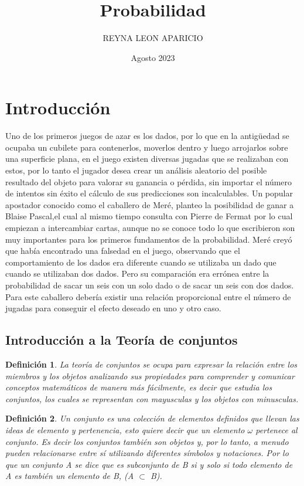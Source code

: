 \documentclass[12pt]{article}
\title{Probabilidad}
\author{REYNA LEON  APARICIO}
\date{Agosto 2023}
\newtheorem{Def}{\quad Definición}
\begin{document}
\maketitle

\section{Introducción}

Uno de los primeros juegos de azar es los dados, por lo que en la antigüedad se ocupaba un cubilete para contenerlos, moverlos dentro y luego arrojarlos sobre una superficie plana, en el juego existen diversas jugadas que se realizaban con estos, por lo tanto el jugador desea crear un análisis aleatorio del posible resultado  del objeto para valorar su ganancia o pérdida, sin importar el número de intentos sin éxito el cálculo de sus predicciones son incalculables. Un popular apostador conocido como el caballero de Meré, planteo la posibilidad de ganar a Blaise Pascal,el cual al mismo tiempo consulta con Pierre de Fermat por lo cual empiezan a intercambiar cartas, aunque no se conoce todo lo que escribieron son muy importantes para los primeros fundamentos de la probabilidad. Meré creyó que había encontrado una falsedad en el juego, observando que el comportamiento de los dados era diferente cuando se utilizaba un dado que cuando se utilizaban dos dados. Pero su comparación era errónea entre la probabilidad de sacar un seis con un solo dado o de sacar un seis con dos dados. Para este caballero debería existir una relación proporcional entre el número de jugadas para conseguir el efecto deseado en uno y otro caso. 

\subsection{Introducción a la Teoría de conjuntos}

\begin{Def}
La teoría de conjuntos se ocupa para expresar la relación entre los miembros y los objetos analizando sus propiedades para comprender y comunicar conceptos matemáticos de manera más fácilmente, es decir que estudia los conjuntos, los cuales se representan con mayusculas y los objetos con minusculas. 
\end{Def}

\begin{Def}
Un conjunto es una colección de elementos definidos que llevan las ideas de elemento y pertenencia, esto quiere decir que un elemento $ \omega $ pertenece al conjunto. Es decir los conjuntos también son objetos y, por lo tanto, a menudo pueden relacionarse entre sí utilizando diferentes símbolos y notaciones.  Por lo que un conjunto A se dice que es subconjunto de B si y solo si todo elemento de A es también un elemento de B, (A $ \subset$ B).
\end{Def}
\end{document}
